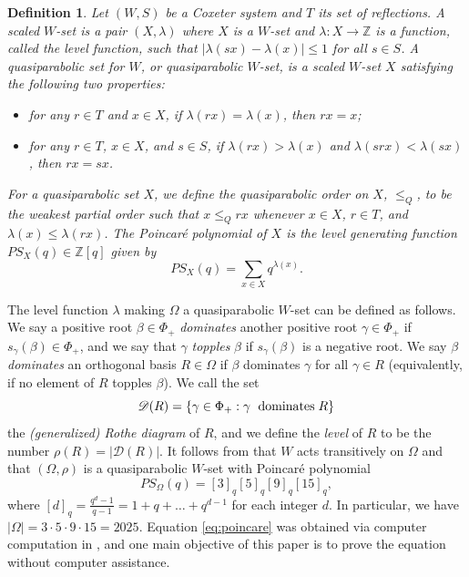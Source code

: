 \documentclass[10pt,a4paper]{amsart}
\newtheorem{defn}[theorem]{Definition}
\numberwithin{equation}{section}
\newcommand{\be}{\beta}
\newcommand{\Z}{{\mathbb Z}}
\newcommand{\res}{\mathscr{D}}
\newcommand{\ob}{\Omega}
\newcommand{\abs}[1]{\lvert #1 \rvert}
\begin{document}
\begin{defn}
\cite[Section 2, Section 5]{rains13}
\label{def:qpset}
Let $(W,S)$ be a Coxeter system and $T$ its set of reflections. A {\it scaled
$W$-set} is a pair $(X, \lambda)$ where $X$ is a $W$-set and $\lambda : X
\rightarrow \Z$ is a function, called the \emph{level function}, such that
$|\lambda(sx) - \lambda(x)| \leq 1$ for all $s \in S$. A {\it quasiparabolic
set for $W$}, or \emph{quasiparabolic $W$-set}, is a scaled $W$-set $X$
satisfying the following two properties:
\begin{itemize}[leftmargin=3.2em] 
  \item[(QP1)]{for any $r \in T$ and $x \in X$,
    if $\lambda(rx) = \lambda(x)$, then $rx = x$;} 
  \item[(QP2)]{for any $r \in
T$, $x \in X$, and $s \in S$, if $\lambda(rx) > \lambda(x)$ and $\lambda(srx) <
\lambda(sx)$, then $rx = sx$.} 
\end{itemize} 
For a quasiparabolic set $X$, we define the \emph{quasiparabolic order} on $X$,
$\le_Q$, to be the weakest partial order such that $x \leq_Q rx$ whenever $x \in
X$, $r \in T$, and $\lambda(x) \leq \lambda(rx)$. The \emph{Poincar\'e
polynomial} of $X$ is the level generating function $PS_X(q)\in \Z[q]$ given by
\[
  PS_X(q)=\sum_{x\in X}q^{\lambda(x)}.
\]
\end{defn}

The level function $\lambda$ making $\ob$ a quasiparabolic $W$-set can be
defined as follows. We say a positive root $\be\in \Phi_+$ \emph{dominates}
another positive root $\gamma\in \Phi_+$ if $s_\gamma(\beta)\in \Phi_+$, and we
say that $\gamma$ \emph{topples} $\beta$ if $s_\gamma(\beta)$
is a negative root. We say $\be$ \emph{dominates} an orthogonal basis $R\in \ob$
if $\be$ dominates $\gamma$ for all $\gamma \in R$ (equivalently, if no element
of $R$ topples $\be$). We call the set
\[
  \res(R)=\{\gamma\in \Phi_+: \gamma \text{\; dominates\;} R\}
\]
the {\it (generalized) Rothe diagram} of $R$, and we define the  {\it level} of
$R$ to be the number $\rho(R) = |\res(R)|$. It follows from  \cite[Theorem
4.3]{gx6} that $W$ acts transitively on $\ob$ and that $(\ob,\rho)$ is a
quasiparabolic $W$-set with Poincar\'e polynomial 
\begin{equation}
\label{eq:poincare}
PS_\ob(q)=[3]_q[5]_q[9]_q[15]_q,
\end{equation}
where $[d]_q=\frac{q^d-1}{q-1}=1+q+\dots+q^{d-1}$ for each integer $d$. In
particular, we have $\abs{\ob}=3\cdot 5\cdot 9\cdot 15=2025$. Equation
\eqref{eq:poincare} was obtained via computer computation in \cite{gx5}, and one
main objective of this paper is to prove the equation without computer assistance.
\end{document}
